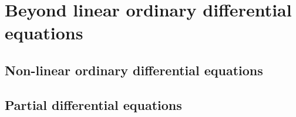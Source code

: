 \chapter{Beyond linear ordinary differential equations}
\section{Non-linear ordinary differential equations}
\section{Partial differential equations}
